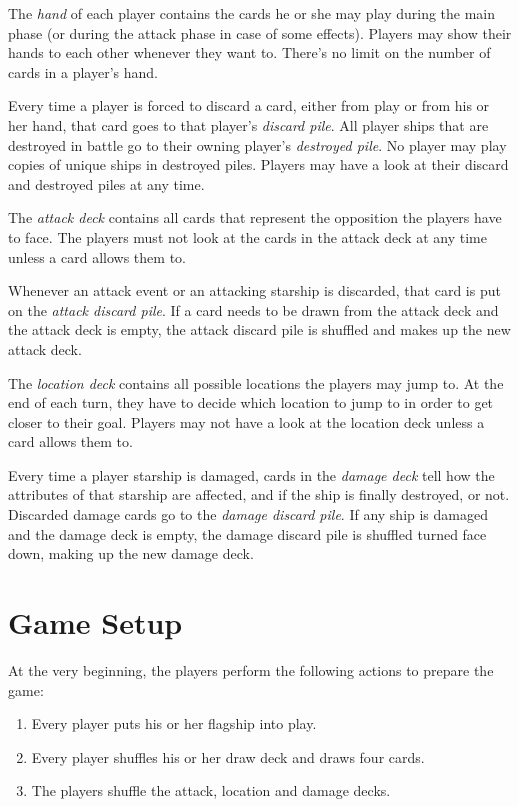 \documentclass[11pt, a4paper]{article}
\begin{document}
The \emph{hand} of each player contains the cards he or she may play during the
main phase (or during the attack phase in case of some effects). Players may
show their hands to each other whenever they want to. There's no limit on the
number of cards in a player's hand.

Every time a player is forced to discard a card, either from play or from his or
her hand, that card goes to that player's \emph{discard pile}. All player ships
that are destroyed in battle go to their owning player's \emph{destroyed pile}.
No player may play copies of unique ships in destroyed piles. Players may have a
look at their discard and destroyed piles at any time.

The \emph{attack deck} contains all cards that represent the opposition the
players have to face. The players must not look at the cards in the attack deck
at any time unless a card allows them to.

Whenever an attack event or an attacking starship is discarded, that card is put
on the \emph{attack discard pile}. If a card needs to be drawn from the attack
deck and the attack deck is empty, the attack discard pile is shuffled and makes
up the new attack deck.

The \emph{location deck} contains all possible locations the players may jump
to. At the end of each turn, they have to decide which location to jump to in
order to get closer to their goal. Players may not have a look at the location
deck unless a card allows them to.

Every time a player starship is damaged, cards in the \emph{damage deck} tell
how the attributes of that starship are affected, and if the ship is finally
destroyed, or not. Discarded damage cards go to the \emph{damage discard pile}.
If any ship is damaged and the damage deck is empty, the damage discard pile
is shuffled turned face down, making up the new damage deck.

\section{Game Setup}

At the very beginning, the players perform the following actions to prepare the
game:

\begin{enumerate}
  \item Every player puts his or her flagship into play.
  \item Every player shuffles his or her draw deck and draws four cards.
  \item The players shuffle the attack, location and damage decks.
\end{enumerate}
\end{document}
